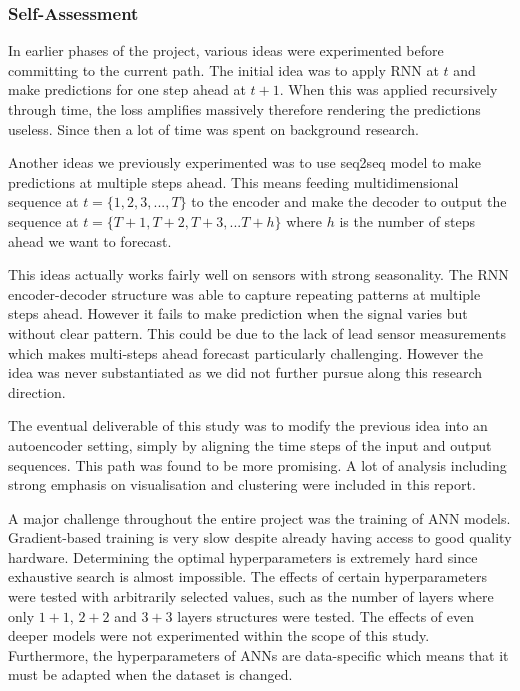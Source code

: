 \documentclass[11pt]{article} %
\theoremstyle{plain}
\theoremstyle{definition}
\begin{document}
\subsubsection{Self-Assessment}

In earlier phases of the project, various ideas were experimented before committing to the current path. The initial idea was to apply RNN at \(t\) and make predictions for one step ahead at \(t+1\). When this was applied recursively through time, the loss amplifies massively therefore rendering the predictions useless. Since then a lot of time was spent on background research.

Another ideas we previously experimented was to use seq2seq model to make predictions at multiple steps ahead. This means feeding multidimensional sequence at \(t=\{1,2,3,...,T\}\) to the encoder and make the decoder to output the sequence at \(t=\{T+1,T+2,T+3,...T+h\}\) where \(h\) is the number of steps ahead we want to forecast.

This ideas actually works fairly well on sensors with strong seasonality. The RNN encoder-decoder structure was able to capture repeating patterns at multiple steps ahead. However it fails to make prediction when the signal varies but without clear pattern. This could be due to the lack of lead sensor measurements which makes multi-steps ahead forecast particularly challenging. However the idea was never substantiated as we did not further pursue along this research direction.

The eventual deliverable of this study was to modify the previous idea into an autoencoder setting, simply by aligning the time steps of the input and output sequences. This path was found to be more promising. A lot of analysis including strong emphasis on visualisation and clustering were included in this report.

A major challenge throughout the entire project was the training of ANN models. Gradient-based training is very slow despite already having access to good quality hardware. Determining the optimal hyperparameters is extremely hard since exhaustive search is almost impossible. The effects of certain hyperparameters were tested with arbitrarily selected values, such as the number of layers where only \(1+1\), \(2+2\) and \(3+3\) layers structures were tested. The effects of even deeper models were not experimented within the scope of this study. Furthermore, the hyperparameters of ANNs are data-specific which means that it must be adapted when the dataset is changed.
\end{document}
